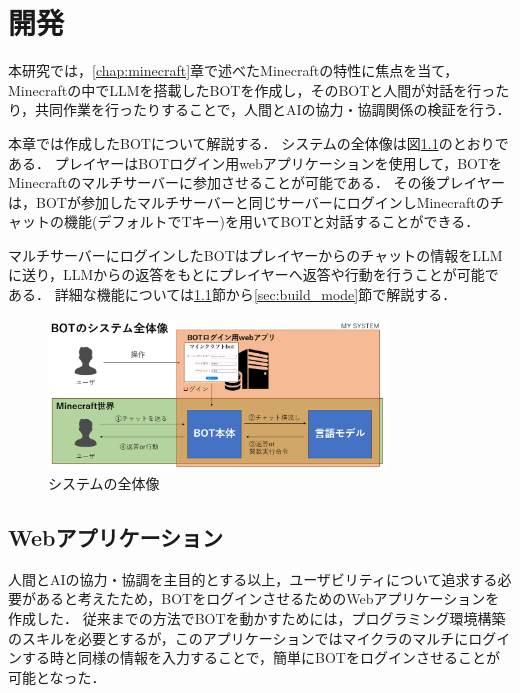 \chapter{開発}	%
\thispagestyle{plain}   %

本研究では，\ref{chap:minecraft}章で述べたMinecraftの特性に焦点を当て，Minecraftの中でLLMを搭載したBOTを作成し，そのBOTと人間が対話を行ったり，共同作業を行ったりすることで，人間とAIの協力・協調関係の検証を行う．

本章では作成したBOTについて解説する．
システムの全体像は図\ref{fig:system}のとおりである．
プレイヤーはBOTログイン用webアプリケーションを使用して，BOTをMinecraftのマルチサーバーに参加させることが可能である．
その後プレイヤーは，BOTが参加したマルチサーバーと同じサーバーにログインしMinecraftのチャットの機能(デフォルトでTキー)を用いてBOTと対話することができる．

マルチサーバーにログインしたBOTはプレイヤーからのチャットの情報をLLMに送り，LLMからの返答をもとにプレイヤーへ返答や行動を行うことが可能である．
詳細な機能については\ref{sec:webapp}節から\ref{sec:build_mode}節で解説する．

\begin{figure}[H]
    \centering
    \includegraphics[width=0.8\textwidth]{fig/my_system.PNG}
    \caption{システムの全体像}
    \label{fig:system}
\end{figure}

\section{Webアプリケーション}\label{sec:webapp}
人間とAIの協力・協調を主目的とする以上，ユーザビリティについて追求する必要があると考えたため，BOTをログインさせるためのWebアプリケーションを作成した．
従来までの方法でBOTを動かすためには，プログラミング環境構築のスキルを必要とするが，このアプリケーションではマイクラのマルチにログインする時と同様の情報を入力することで，簡単にBOTをログインさせることが可能となった．


